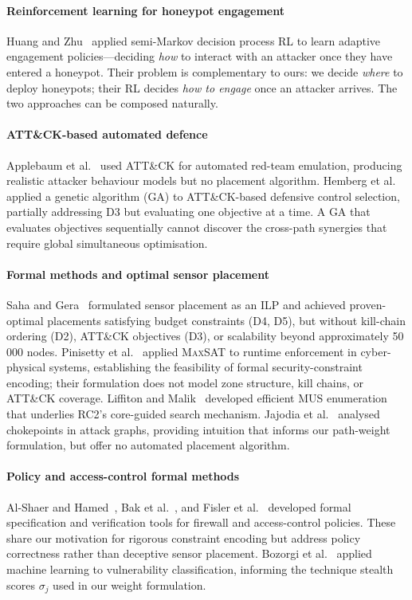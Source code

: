 \documentclass[journal]{IEEEtran}
\newcommand{\MAXSAT}{\textsc{MaxSAT}}
\begin{document}
\paragraph{Reinforcement learning for honeypot engagement}
Huang and Zhu~\cite{huang2019} applied semi-Markov decision process
RL to learn adaptive engagement policies---deciding \emph{how} to
interact with an attacker once they have entered a honeypot. Their
problem is complementary to ours: we decide \emph{where} to deploy
honeypots; their RL decides \emph{how to engage} once an attacker
arrives. The two approaches can be composed naturally.

\paragraph{ATT\&CK-based automated defence}
Applebaum et al.~\cite{applebaum2016} used ATT\&CK for automated
red-team emulation, producing realistic attacker behaviour models but
no placement algorithm. Hemberg et al.~\cite{hemberg2018} applied a
genetic algorithm (GA) to ATT\&CK-based defensive control selection,
partially addressing D3 but evaluating one objective at a time. A
GA that evaluates objectives sequentially cannot discover the
cross-path synergies that require global simultaneous optimisation.

\paragraph{Formal methods and optimal sensor placement}
Saha and Gera~\cite{saha2015} formulated sensor placement as an ILP
and achieved proven-optimal placements satisfying budget constraints
(D4, D5), but without kill-chain ordering (D2), ATT\&CK objectives
(D3), or scalability beyond approximately 50\,000 nodes.
Pinisetty et al.~\cite{pinisetty2017} applied \MAXSAT{} to runtime
enforcement in cyber-physical systems, establishing the feasibility
of formal security-constraint encoding; their formulation does not
model zone structure, kill chains, or ATT\&CK coverage.
Liffiton and Malik~\cite{liffiton2016} developed efficient MUS
enumeration that underlies RC2's core-guided search mechanism.
Jajodia et al.~\cite{jajodia2005} analysed chokepoints in attack
graphs, providing intuition that informs our path-weight formulation,
but offer no automated placement algorithm.

\paragraph{Policy and access-control formal methods}
Al-Shaer and Hamed~\cite{alshaer2004}, Bak et al.~\cite{bak2009},
and Fisler et al.~\cite{fisler2005} developed formal specification
and verification tools for firewall and access-control policies. These
share our motivation for rigorous constraint encoding but address
policy correctness rather than deceptive sensor placement.
Bozorgi et al.~\cite{bozorgi2010} applied machine learning to
vulnerability classification, informing the technique stealth scores
$\sigma_j$ used in our weight formulation.
\end{document}
